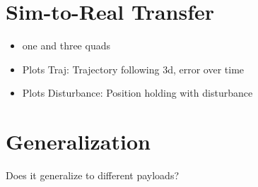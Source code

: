 \section{Sim-to-Real Transfer}
\begin{itemize}
    \item one and three quads
    \item Plots Traj: Trajectory following 3d,  error over time 
    \item Plots Disturbance: Position holding with disturbance
\end{itemize}

\section{Generalization}
Does it generalize to different payloads?
